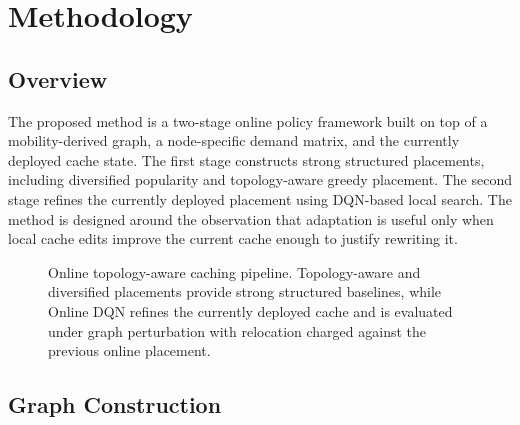 \section{Methodology}

\subsection{Overview}

The proposed method is a two-stage online policy framework built on top of a mobility-derived graph, a node-specific demand matrix, and the currently deployed cache state. The first stage constructs strong structured placements, including diversified popularity and topology-aware greedy placement. The second stage refines the currently deployed placement using DQN-based local search. The method is designed around the observation that adaptation is useful only when local cache edits improve the current cache enough to justify rewriting it.

\begin{figure}[t]
\centering
{}
\caption{Online topology-aware caching pipeline. Topology-aware and diversified placements provide strong structured baselines, while Online DQN refines the currently deployed cache and is evaluated under graph perturbation with relocation charged against the previous online placement.}
\label{fig:pipeline}
\end{figure}

\subsection{Graph Construction}

